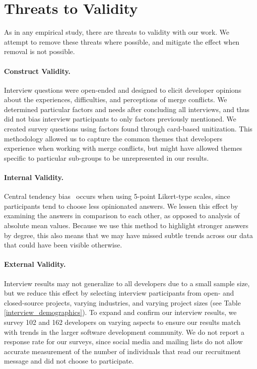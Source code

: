 \section{Threats to Validity}\label{threats}
As in any empirical study, there are threats to validity with our work.
We attempt to remove these threats where possible, and mitigate the effect when removal is not possible.

\paragraph{Construct Validity.}
Interview questions were open-ended and designed to elicit developer opinions about the experiences, difficulties, and perceptions of merge conflicts.
We determined particular factors and needs after concluding all interviews, and thus did not bias interview participants to only factors previously mentioned.
We created survey questions using factors found through card-based unitization.
This methodology allowed us to capture the common themes that developers experience when working with merge conflicts, but might have allowed themes specific to particular sub-groups to be unrepresented in our results.

\paragraph{Internal Validity.}
Central tendency bias~\cite{guilford1954psychometric} occurs when using 5-point Likert-type scales, since participants tend to choose less opinionated answers.
We lessen this effect by examining the answers in comparison to each other, as opposed to analysis of absolute mean values.
Because we use this method to highlight stronger answers by degree, this also means that we may have missed subtle trends across our data that could have been visible otherwise.

\paragraph{External Validity.}
Interview results may not generalize to all developers due to a small sample size, but we reduce this effect by selecting interview participants from open- and closed-source projects, varying industries, and varying project sizes (see Table \ref{interview_demographics}).
To expand and confirm our interview results, we survey 102 and 162 developers on varying aspects to ensure our results match with trends in the larger software development community.
We do not report a response rate for our surveys, since social media and mailing lists do not allow accurate measurement of the number of individuals that read our recruitment message and did not choose to participate.




